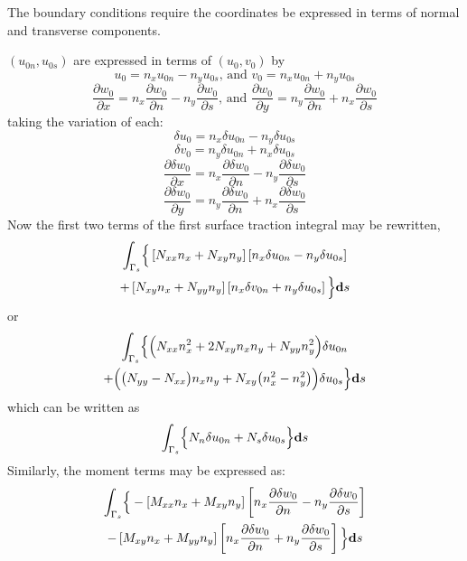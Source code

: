 \documentclass[11pt,letterpaper,titlepage,draft]{article}
\newcommand{\diff}{\textbf d}
\newcommand{\PDer}[2]{\frac{\partial #1}{\partial #2}}
\newcommand{\Vartn}[1]{\delta #1}
\numberwithin{equation}{subsection}
\begin{document}
The boundary conditions require the coordinates be expressed in terms of normal and transverse components.\par
$(u_{0n}, u_{0s})$ are expressed in terms of $(u_0, v_0)$ by \\
$$u_0 = n_x u_{0n} - n_y u_{0s}\text{, and } v_0 = n_x u_{0n} + n_y u_{0s}$$
$$\PDer{w_0}{x} = n_x\PDer{w_0}{n} - n_y\PDer{w_0}{s}\text{, and }\PDer{w_0}{y} = n_y\PDer{w_0}{n} + n_x\PDer{w_0}{s}$$
taking the variation of each:
$$\Vartn{u_0} = n_x \Vartn{u_{0n}} - n_y \Vartn{u_{0s}}$$
$$\Vartn{v_0} = n_y \Vartn{u_{0n}} + n_x \Vartn{u_{0s}}$$
$$\PDer{\Vartn{w_0}}{x} = n_x \PDer{\Vartn{w_0}}{n} - n_y \PDer{\Vartn{w_0}}{s}$$
$$\PDer{\Vartn{w_0}}{y} = n_y \PDer{\Vartn{w_0}}{n} + n_x \PDer{\Vartn{w_0}}{s}$$
Now the first two terms of the first surface traction integral may be rewritten,
\begin{multline}\label{E:S1001:SS102:18}
\int_{\Gamma_s} \Bigl\{ \Bigr.
  \left[N_{xx} n_x + N_{xy} n_y\right]  \left[ n_x \Vartn{u_{0n}} - n_y \Vartn{u_{0s}} \right]
  \\ 
  +
  \left[N_{xy} n_x + N_{yy} n_y\right]  \left[ n_x \Vartn{v_{0n}} + n_y \Vartn{u_{0s}} \right]
  \Bigl.\Bigr\} \diff{s}
\end{multline}
or
\begin{multline}\label{E:S1001:SS102:19}
\int_{\Gamma_s} \Bigl\{ \Bigr.
  \Bigl(N_{xx} n_x^2 + 2 N_{xy} n_x n_y + N_{yy} n_y^2\Bigr) \Vartn{u_{0n}} 
  \\
  + \Bigl( \bigl( N_{yy} - N_{xx}\bigr) n_x n_y + N_{xy} \bigl(n_x^2 - n_y^2 \bigr) \Bigr) \Vartn{u_{0s}} 
  \Bigl.\Bigr\} \diff{s}
\end{multline}
which can be written as
\begin{equation}\label{E:S1001:SS102:20}
\int_{\Gamma_s} \Bigl\{ \Bigr.
  N_n \Vartn{u_{0n}} + N_s \Vartn{u_{0s}} 
  \Bigl.\Bigr\} \diff{s}
\end{equation}
Similarly, the moment terms may be expressed as:
\begin{multline}\label{E:S1001:SS102:21}
\int_{\Gamma_s} \Bigl\{ \Bigr.
  -\left[M_{xx} n_x + M_{xy} n_y\right]  \left[ n_x \PDer{\Vartn{w_0}}{n} - n_y \PDer{\Vartn{w_0}}{s} \right]
  \\ 
  -
  \left[M_{xy} n_x + M_{yy} n_y\right]  \left[ n_x \PDer{\Vartn{w_0}}{n} + n_y \PDer{\Vartn{w_0}}{s} \right]
  \Bigl.\Bigr\} \diff{s}
\end{multline}
\end{document}
